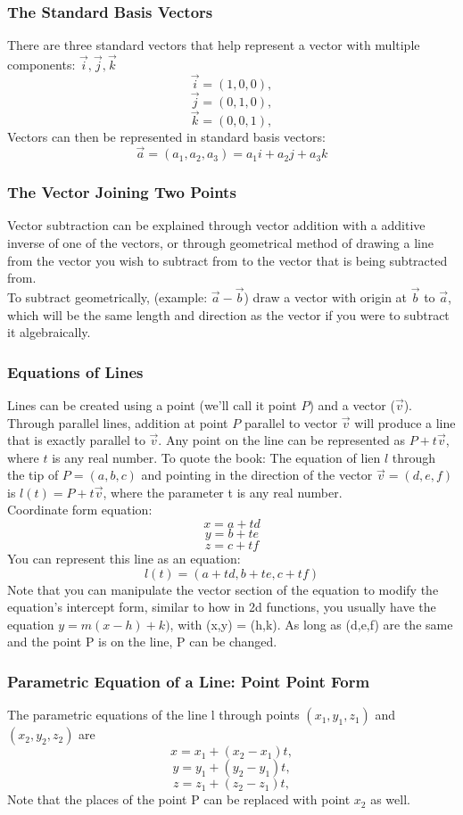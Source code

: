 \documentclass{article}
\begin{document}
\subsubsection{The Standard Basis Vectors}
There are three standard vectors that help represent a vector with multiple components: $\vec{i}, \vec{j}, \vec{k}$
	$$\vec{i} = (1,0,0),$$
	$$\vec{j} = (0,1,0),$$
	$$\vec{k} = (0,0,1),$$
  Vectors can then be represented in standard basis vectors:
  $$ \vec{a} = (a_1,a_2,a_3) = a_1 i + a_2 j + a_3 k $$ 

  \subsubsection{The Vector Joining Two Points}
  Vector subtraction can be explained through vector addition with a additive inverse of one of the vectors,
  or through geometrical method of drawing a line from the vector you wish to subtract from to the vector that
  is being subtracted from.
  \\ To subtract geometrically, (example: $\vec{a} - \vec{b}$) draw a vector with origin at $\vec{b}$ to $\vec{a}$, which will be the same length and direction as the vector if you were to subtract it algebraically.
  \subsubsection{Equations of Lines}
	Lines can be created using a point (we'll call it point $P$) and a vector ($\vec{v}$).
	Through parallel lines, addition at point $P$ parallel to vector $\vec{v}$ will produce a line that is exactly parallel to $\vec{v}$. Any point on the line can be represented as $P + t\vec{v}$, where $t$ is any real number.
	To quote the book:
	The equation of lien $l$ through the tip of $P = (a,b,c)$ and pointing in the direction of the vector $\vec{v} = (d,e,f)$ is $l(t) = P + t\vec{v}$, where the parameter t is any real number.
	\\Coordinate form equation:
	$$ x = a + td $$
	$$ y = b + te $$
	$$ z = c + tf $$
	You can represent this line as an equation: 
	$$l(t) = (a + td, b + te, c + tf)$$
	Note that you can manipulate the vector section of the equation to modify the equation's intercept form, similar
	to how in 2d functions, you usually have the equation $y = m(x-h) + k)$, with (x,y) = (h,k). As long as (d,e,f) are the same and the point P is on the line, P can be changed.

\subsubsection{Parametric Equation of a Line: Point Point Form}
	The parametric equations of the line l through points $(x_1,y_1,z_1)$ and $(x_2,y_2,z_2)$ are 
	$$ x = x_1 + (x_2 - x_1) t,$$
	$$ y = y_1 + (y_2 - y_1) t,$$
	$$ z = z_1 + (z_2 - z_1) t,$$
	Note that the places of the point P can be replaced with point $x_2$ as well.
\end{document}

